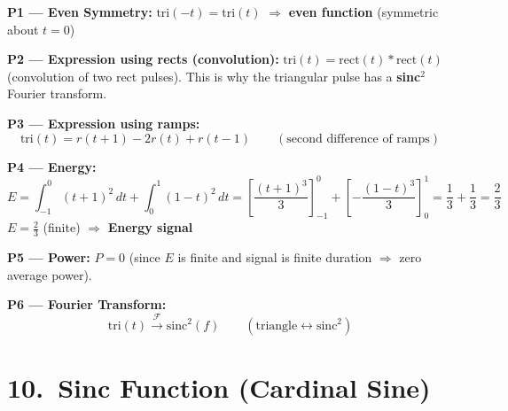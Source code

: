 \documentclass[10pt,a4paper]{article}
\begin{document}
\begin{center}
\end{center}

\begin{propbox}
\textbf{P1 --- Even Symmetry:}
$\text{tri}(-t) = \text{tri}(t)$ $\Rightarrow$ \textbf{even function} (symmetric about $t=0$)

\medskip
\textbf{P2 --- Expression using rects (convolution):}
$\text{tri}(t) = \text{rect}(t) * \text{rect}(t)$ (convolution of two rect pulses).
This is why the triangular pulse has a \textbf{sinc}$^2$ Fourier transform.

\medskip
\textbf{P3 --- Expression using ramps:}
\[
  \text{tri}(t) = r(t+1) - 2r(t) + r(t-1) \qquad (\text{second difference of ramps})
\]

\medskip
\textbf{P4 --- Energy:}
\[
  E = \int_{-1}^{0}(t+1)^2\,dt + \int_{0}^{1}(1-t)^2\,dt
    = \left[\frac{(t+1)^3}{3}\right]_{-1}^{0}+\left[-\frac{(1-t)^3}{3}\right]_{0}^{1}
    = \frac{1}{3}+\frac{1}{3} = \frac{2}{3}
\]
$E=\tfrac{2}{3}$ (finite) $\Rightarrow$ \textbf{Energy signal}

\medskip
\textbf{P5 --- Power:} $P=0$ (since $E$ is finite and signal is finite duration $\Rightarrow$ zero average power).

\medskip
\textbf{P6 --- Fourier Transform:}
\[
  \text{tri}(t) \xrightarrow{\mathcal{F}} \text{sinc}^2(f) \qquad (\text{triangle}\leftrightarrow\text{sinc}^2)
\]
\end{propbox}

\section{10.\ Sinc Function (Cardinal Sine)}
\end{document}
